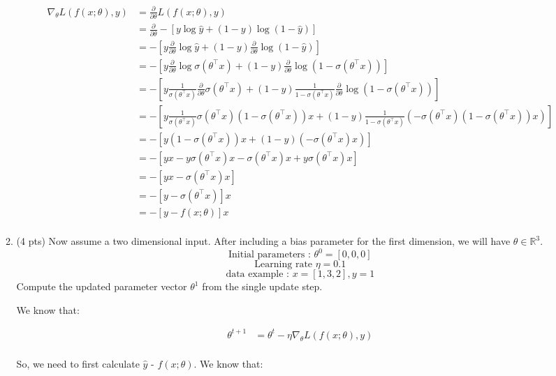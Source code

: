 \documentclass[a4paper]{article}
\theoremstyle{definition}
\newenvironment{soln}{
    \leavevmode\color{blue}\ignorespaces
}{}
\begin{document}
\begin{enumerate}
\begin{enumerate}
\begin{soln}
		$$
		\begin{align}
		\nabla_{\theta} L(f(x;\theta), y) &= \frac{\partial}{\partial \theta} L(f(x;\theta), y) \\
		&= \frac{\partial}{\partial \theta} -[y \log  \hat{y} + (1-y)\log(1-\hat{y})] \\
		&= -[y \frac{\partial}{\partial \theta} \log  \hat{y} + (1-y)\frac{\partial}{\partial \theta} \log(1-\hat{y})] \\
		&= -[y \frac{\partial}{\partial \theta} \log  \sigma(\theta^\top x) + (1-y)\frac{\partial}{\partial \theta} \log(1-\sigma(\theta^\top x))] \\
		&= -[y \frac{1}{\sigma(\theta^\top x)} \frac{\partial}{\partial \theta} \sigma(\theta^\top x) + (1-y)\frac{1}{1-\sigma(\theta^\top x)}\frac{\partial}{\partial \theta} \log(1-\sigma(\theta^\top x))] \\
		&= -[y \frac{1}{\sigma(\theta^\top x)} \sigma(\theta^\top x) (1 - \sigma(\theta^\top x)) x + (1-y)\frac{1}{1-\sigma(\theta^\top x)}(-\sigma(\theta^\top x) (1 - \sigma(\theta^\top x)) x)] \\
		&= -[y (1 - \sigma(\theta^\top x)) x + (1-y)(-\sigma(\theta^\top x) x)] \\
		&= -[y x - y \sigma(\theta^\top x) x - \sigma(\theta^\top x) x + y \sigma(\theta^\top x) x] \\
		&= -[y x - \sigma(\theta^\top x) x] \\
		&= -[y - \sigma(\theta^\top x)] x \\
		&= -[y - f(x;\theta)] x \\
		\end{align}
		$$
	\end{soln}
	
	\item (4 pts)
 Now assume a two dimensional input. After including a bias parameter for the first dimension, we will have $\theta\in\mathbb{R}^3$.
$$ \text{Initial parameters : }  \theta^{0}=[0, 0, 0]$$
$$ \text{Learning rate }\eta=0.1$$
$$ \text{data example : } x=[1, 3, 2], y=1$$
Compute the updated parameter vector $\theta^{1}$ from the single update step.
	
	\begin{soln}  We know that:

		$$
		\begin{align}
		\theta^{t+1} &= \theta^{t} - \eta \nabla_{\theta} L(f(x;\theta), y) \\
		\end{align}
		$$
		
		So, we need to first calculate $\hat{y}$ - $f(x;\theta)$. We know that:
		

\end{soln}
\end{enumerate}
\end{enumerate}
\end{document}
